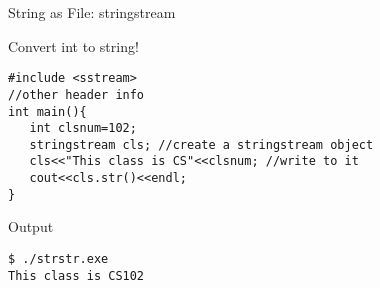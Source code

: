 \documentclass[xcolor={dvipsnames}]{beamer}
\begin{document}
\begin{frame}[fragile]{String as File: stringstream}
\begin{block}{Convert int to string!}
\begin{verbatim}
#include <sstream>
//other header info
int main(){
   int clsnum=102;
   stringstream cls; //create a stringstream object
   cls<<"This class is CS"<<clsnum; //write to it
   cout<<cls.str()<<endl;
}
\end{verbatim}
\end{block}

\begin{block}{Output}
\begin{verbatim}
$ ./strstr.exe
This class is CS102
\end{verbatim}
\end{block}
\end{frame}
\end{document}
